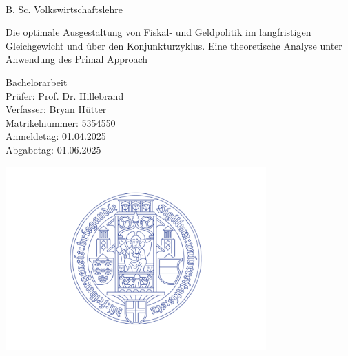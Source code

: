 \begin{center}


\Large {} \\ B. Sc. Volkswirtschaftslehre \normalfont



\vspace{3.5cm}
\LARGE Die optimale Ausgestaltung von Fiskal- und Geldpolitik im langfristigen Gleichgewicht und über den Konjunkturzyklus. Eine theoretische Analyse unter Anwendung des Primal Approach  \normalfont
\vspace{3.5cm}



\large
Bachelorarbeit\\
Prüfer: Prof. Dr. Hillebrand\\
Verfasser: Bryan Hütter\\
Matrikelnummer: 5354550\\
Anmeldetag: 01.04.2025\\
Abgabetag: 01.06.2025\\
\normalfont



\vspace*{\fill}
\includegraphics[width=0.75\textwidth]{Siegel_Uni_Freiburg}
\end{center}